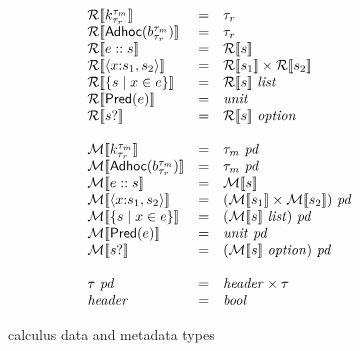 \begin{figure}

\[
\begin{array}{lcl}
\repty{\Sk} & = & \tau_r \\
\repty{\SAdhoc{b}} & = & \tau_r \\
\repty{\SPath{e}{s}} & = & \repty{s} \\
\repty{\SPair{x}{s_1}{s_2}} & = & \repty{s_1} \times \repty{s_2} \\
\repty{\SSetComp{s}{x}{e}} & = & \repty{s}~\typ{list}  \\
\repty{\SPred{e}} & = & \typ{unit} \\
\repty{\SOption{s}} & = & \repty{s}~\typ{option}  \\
\\
\mdty{\Sk} & = & \tau_m~\mathit{pd}\\
\mdty{\SAdhoc{b}} & = & \tau_m~\mathit{pd}\\
\mdty{\SPath{e}{s}} & = & \mdty{s} \\
\mdty{\SPair{x}{s_1}{s_2}} & = & \pd{\mdty{s_1} \times \mdty{s_2}} \\
\mdty{\SSetComp{s}{x}{e}} & = & \pd{\mdty{s}~\typ{list}}  \\
\mdty{\SPred{e}} & = & \typ{unit}~\mathit{pd}\\
\mdty{\SOption{s}} & = & \pd{\mdty{s}~\typ{option}}  \\
\\
\tau~\mathit{pd} & = & \typ{header} \times \tau \\
\typ{header} & = & \typ{bool} 
\end{array}
\]
\caption{\forest{} calculus data and metadata types}
\label{fig:calculus-types}
\end{figure}
